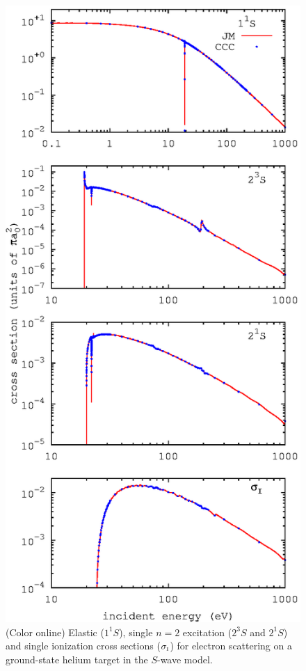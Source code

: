 \documentclass[aip
, pra
, showpacs
, aps
, twocolumn
, groupedaddress
, floatfix
]{revtex4}
\begin{document}
\begin{figure}[htb]
\includegraphics[scale=0.9]{fig1.ps}
\caption{(Color online) Elastic ($1^1S$),
single $n=2$ excitation ($2^3S$ and $2^1S$) and single ionization cross sections ($\sigma_{\mbox{\tiny{I}}}$) for electron scattering on a ground-state helium target in
the $S$-wave model.}
\label{Fig_TICS}
\end{figure}
\end{document}
